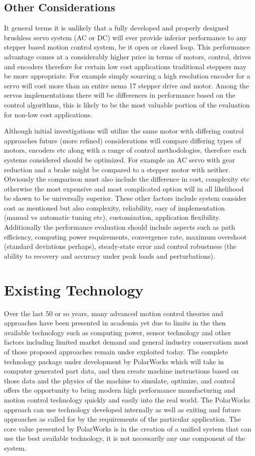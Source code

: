 \documentclass{article}
\begin{document}
\subsection{Other Considerations}
It general terms it is unlikely that a fully developed and properly designed brushless servo system (AC or DC) will ever provide inferior performance to any stepper based motion control system, be it open or closed loop. This performance advantage comes at a considerably higher price in terms of motors, control, drives and encoders therefore for certain low cost applications traditional steppers may be more appropriate. For example simply sourcing a high resolution encoder for a servo will cost more than an entire nema 17 stepper drive and motor. Among the servos implementations there will be differences in performance based on the control algorithms, this is likely to be the most valuable portion of the evaluation for non-low cost applications. 
\par
Although initial investigations will utilize the same motor with differing control approaches future (more refined) considerations will compare differing types of motors, encoders etc along with a range of control methodologies, therefore each systems considered should be optimized. For example an AC servo with gear reduction and a brake might be compared to a stepper motor with neither. Obviously the comparison must also include the difference in cost, complexity etc otherwise the most expensive and most complicated option will in all likelihood be shown to be universally superior. These other factors include system consider cost as mentioned but also complexity, reliability, easy of implementation (manual vs automatic tuning etc), customization, application flexibility. Additionally the performance evaluation should include aspects such as path efficiency, computing power requirements, convergence rate, maximum overshoot (standard deviations perhaps), steady-state error and control robustness (the ability to recovery and accuracy under peak loads and perturbations). 
\section{Existing Technology}
Over the last 50 or so years, many advanced motion control theories and approaches have been presented in academia yet due to limits in the then available technology such as computing power, sensor technology and other factors including limited market demand and general industry conservatism most of those proposed approaches remain under exploited today. The complete technology package under development by PolarWorks which will take in computer generated part data, and then create machine instructions based on those data and the physics of the machine to simulate, optimize, and control offers the opportunity to bring modern high performance manufacturing and motion control technology quickly and easily into the real world.  The PolarWorks approach can use technology developed internally as well as exiting and future approaches as called for by the requirements of the particular application. The core value presented by PolarWorks is in the creation of a unified system that can use the best available technology, it is not necessarily any one component of the system.  
\end{document}
